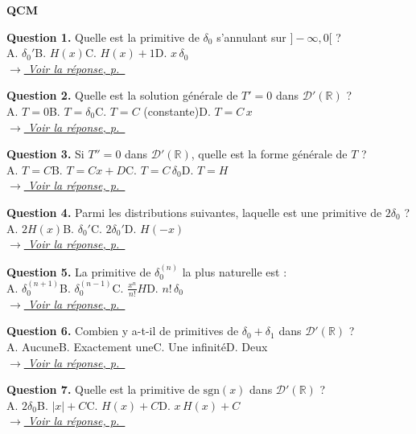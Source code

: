\documentclass[12pt,a4paper,openany]{book}
\theoremstyle{definition}
\theoremstyle{plain}
\theoremstyle{remark}
\newenvironment{qcmblock}{%
	\begin{mdframed}[linewidth=0.5pt, linecolor=black!35,
		backgroundcolor=gray!5,
		skipabove=12pt, skipbelow=12pt,
		innerleftmargin=12pt, innerrightmargin=8pt,
		innertopmargin=8pt, innerbottommargin=8pt]%
		\noindent\textbf{\scshape QCM}\par\smallskip%
	}{%
	\end{mdframed}%
}
\newcommand{\navtoQCMRep}[2]{%
	\vspace{2pt}%
	\noindent\hfill{\small\itshape%
		\hyperlink{qcmrep:#1:q#2}{$\rightarrow$ Voir la réponse, p.~\pageref*{qcmrep:#1:q#2}}%
	}%
	\vspace{6pt}%
}
\begin{document}
	\begin{qcmblock}
		\hypertarget{qcm:ch4:start}{}\label{qcm:ch4:start}
		\hypertarget{qcm:ch4:q1}{}\label{qcm:ch4:q1}
		\textbf{Question 1.} Quelle est la primitive de $\delta_0$ s'annulant sur $]-\infty, 0[$ ?\\
		A. $\delta_0'$\quad B. $H(x)$\quad C. $H(x) + 1$\quad D. $x\,\delta_0$\\
		\navtoQCMRep{ch4}{1}
		
		\medskip
		\hypertarget{qcm:ch4:q2}{}\label{qcm:ch4:q2}
		\textbf{Question 2.} Quelle est la solution générale de $T' = 0$ dans $\mathcal{D}'(\mathbb{R})$ ?\\
		A. $T = 0$\quad B. $T = \delta_0$\quad C. $T = C$ (constante)\quad D. $T = C\,x$\\
		\navtoQCMRep{ch4}{2}
		
		\medskip
		\hypertarget{qcm:ch4:q3}{}\label{qcm:ch4:q3}
		\textbf{Question 3.} Si $T'' = 0$ dans $\mathcal{D}'(\mathbb{R})$, quelle est la forme générale de $T$ ?\\
		A. $T = C$\quad B. $T = Cx + D$\quad C. $T = C\,\delta_0$\quad D. $T = H$\\
		\navtoQCMRep{ch4}{3}
		
		\medskip
		\hypertarget{qcm:ch4:q4}{}\label{qcm:ch4:q4}
		\textbf{Question 4.} Parmi les distributions suivantes, laquelle est une primitive de $2\delta_0$ ?\\
		A. $2H(x)$\quad B. $\delta_0'$\quad C. $2\delta_0'$\quad D. $H(-x)$\\
		\navtoQCMRep{ch4}{4}
		
		\medskip
		\hypertarget{qcm:ch4:q5}{}\label{qcm:ch4:q5}
		\textbf{Question 5.} La primitive de $\delta_0^{(n)}$ la plus naturelle est :\\
		A. $\delta_0^{(n+1)}$\quad B. $\delta_0^{(n-1)}$\quad C. $\frac{x^n}{n!}H$\quad D. $n!\,\delta_0$\\
		\navtoQCMRep{ch4}{5}
		
		\medskip
		\hypertarget{qcm:ch4:q6}{}\label{qcm:ch4:q6}
		\textbf{Question 6.} Combien y a-t-il de primitives de $\delta_0 + \delta_1$ dans $\mathcal{D}'(\mathbb{R})$ ?\\
		A. Aucune\quad B. Exactement une\quad C. Une infinité\quad D. Deux\\
		\navtoQCMRep{ch4}{6}
		
		\medskip
		\hypertarget{qcm:ch4:q7}{}\label{qcm:ch4:q7}
		\textbf{Question 7.} Quelle est la primitive de $\mathrm{sgn}(x)$ dans $\mathcal{D}'(\mathbb{R})$ ?\\
		A. $2\delta_0$\quad B. $|x| + C$\quad C. $H(x) + C$\quad D. $x\,H(x) + C$\\
		\navtoQCMRep{ch4}{7}
		

\end{qcmblock}
\end{document}
